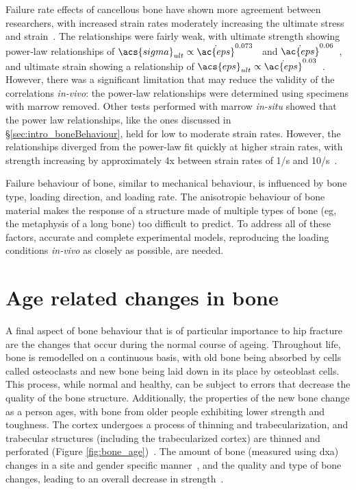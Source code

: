 Failure rate effects of cancellous bone have shown more agreement between researchers, with increased strain rates moderately increasing the ultimate stress and strain~\citep{carter_compressive_1977, linde_mechanical_1991}.
The relationships were fairly weak, with ultimate strength showing power-law relationships of $ \acs{sigma}_{ult} \propto \dot{\ac{eps}}^{0.073} $~\citep{linde_mechanical_1991} and $ \dot{\ac{eps}}^{0.06} $~\citep{carter_compressive_1977}, and ultimate strain showing a relationship of $ \acs{eps}_{ult} \propto \dot{\ac{eps}}^{0.03} $~\citep{linde_mechanical_1991}.
However, there was a significant limitation that may reduce the validity of the correlations \textit{in-vivo}: the power-law relationships were determined using specimens with marrow removed.
Other tests performed with marrow \textit{in-situ} showed that the power law relationships, like the ones discussed in \S\ref{sec:intro_boneBehaviour}, held for low to moderate strain rates.
However, the relationships diverged from the power-law fit quickly at higher strain rates, with strength increasing by approximately 4x between strain rates of 1/\ac{s} and 10/\ac{s}~\citep{carter_compressive_1977}.

Failure behaviour of bone, similar to mechanical behaviour, is influenced by bone type, loading direction, and loading rate.
The anisotropic behaviour of bone material makes the response of a structure made of multiple types of bone (\ac{eg}, the metaphysis of a long bone) too difficult to predict.
To address all of these factors, accurate and complete experimental models, reproducing the loading conditions \textit{in-vivo} as closely as possible, are needed.

\section{Age related changes in bone}
\label{sec:intro_boneAge}
A final aspect of bone behaviour that is of particular importance to hip fracture are the changes that occur during the normal course of ageing.
Throughout life, bone is remodelled on a continuous basis, with old bone being absorbed by cells called osteoclasts and new bone being laid down in its place by osteoblast cells.
This process, while normal and healthy, can be subject to errors that decrease the quality of the bone structure.
Additionally, the properties of the new bone change as a person ages, with bone from older people exhibiting lower strength and toughness.
The cortex undergoes a process of thinning and trabecularization, and trabecular structures (including the trabecularized cortex) are thinned and perforated (Figure \ref{fig:bone_age})~\citep{parfitt_age-related_1984}.
The amount of bone (measured using \ac{dxa}) changes in a site and gender specific manner~\cite{burger_association_1994}, and the quality and type of bone changes, leading to an overall decrease in strength~\citep{mccalden_age-related_1997}.

